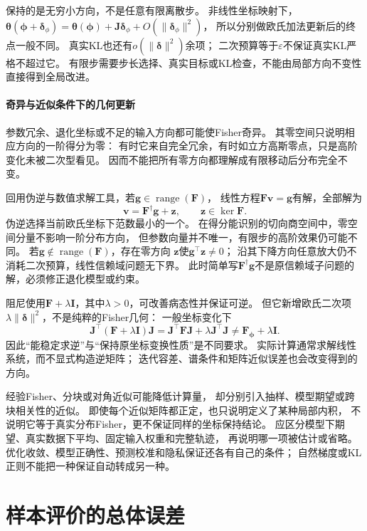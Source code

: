 保持的是无穷小方向，不是任意有限离散步。
非线性坐标映射下，
\(\bm\theta(\bm\phi+\bm\delta_\phi)
=\bm\theta(\bm\phi)+\bm J\bm\delta_\phi+O(\|\bm\delta_\phi\|^2)\)，
所以分别做欧氏加法更新后的终点一般不同。
真实KL也还有\(o(\|\bm\delta\|^2)\)余项；
二次预算等于\(\varepsilon\)不保证真实KL严格不超过它。
有限步需要步长选择、真实目标或KL检查，不能由局部方向不变性直接得到全局改进。

\paragraph{奇异与近似条件下的几何更新}
\label{sec:information-singular-approximate-update}

参数冗余、退化坐标或不足的输入方向都可能使Fisher奇异。
其零空间只说明相应方向的一阶得分为零：
有时它来自完全冗余，有时如立方高斯零点，只是高阶变化未被二次型看见。
因而不能把所有零方向都理解成有限移动后分布完全不变。

回用伪逆与数值求解工具，若\(\bm g\in\operatorname{range}(\bm F)\)，
线性方程\(\bm F\bm v=\bm g\)有解，全部解为
\[
  \bm v=\bm F^\dagger\bm g+\bm z,\qquad
  \bm z\in\ker\bm F.
\]
伪逆选择当前欧氏坐标下范数最小的一个。
在得分能识别的切向商空间中，零空间分量不影响一阶分布方向，
但参数向量并不唯一，有限步的高阶效果仍可能不同。
若\(\bm g\notin\operatorname{range}(\bm F)\)，存在零方向
\(\bm z\)使\(\bm g^\top\bm z\neq0\)；
沿其下降方向任意放大仍不消耗二次预算，线性信赖域问题无下界。
此时简单写\(\bm F^\dagger\bm g\)不是原信赖域子问题的解，必须修正退化模型或约束。

阻尼使用\(\bm F+\lambda\bm I\)，其中\(\lambda>0\)，可改善病态性并保证可逆。
但它新增欧氏二次项\(\lambda\|\bm\delta\|^2\)，不是纯粹的Fisher几何：
一般坐标变化下
\[
  \bm J^\top(\bm F+\lambda\bm I)\bm J
  =\bm J^\top\bm F\bm J+\lambda\bm J^\top\bm J
  \neq\bm F_{\bm\phi}+\lambda\bm I.
\]
因此“能稳定求逆”与“保持原坐标变换性质”是不同要求。
实际计算通常求解线性系统，而不显式构造逆矩阵；
迭代容差、谱条件和矩阵近似误差也会改变得到的方向。

经验Fisher、分块或对角近似可能降低计算量，
却分别引入抽样、模型期望或跨块相关性的近似。
即使每个近似矩阵都正定，也只说明定义了某种局部内积，
不说明它等于真实分布Fisher，更不保证同样的坐标保持结论。
应区分模型下期望、真实数据下平均、固定输入权重和完整轨迹，
再说明哪一项被估计或省略。
优化收敛、模型正确性、预测校准和隐私保证还各有自己的条件；
自然梯度或KL正则不能把一种保证自动转成另一种。

\section{样本评价的总体误差}
\label{sec:information-data-dependent-evaluation}

